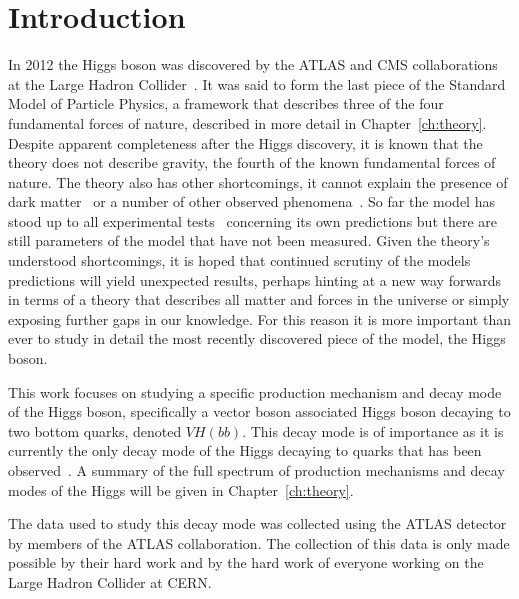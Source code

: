 \chapter{Introduction}%
\label{ch:intro}

In 2012 the Higgs boson was discovered by the ATLAS and CMS collaborations at
the Large Hadron Collider~\cite{DiscoHiggsATLAS, DiscoHiggsCMS}. It was said to
form the last piece of the Standard Model of Particle Physics, a framework that
describes three of the four fundamental forces of nature, described in more
detail in Chapter~\ref{ch:theory}. Despite apparent completeness after the
Higgs discovery, it is known that the theory does not describe gravity, the
fourth of the known fundamental forces of nature. The theory also has other
shortcomings, it cannot explain the presence of dark matter~\cite{DM-ev-sloan,
  DM-ev-nucleosynth, DM-ev-supernova, DM-ev-scaffold, DM-ev-direct,
  DM-ev-strong-lens, DM-ev-candidates, DM-ev-PDG, DM-ev-Zwicky,
  DM-ev-nonbaryonic, DM-ev-particle} or a number of other observed
phenomena~\cite{anom-BD-branching, anom-Dtau-excess, anom-g-2,
  anom-proton-radius, anom-bsll-trans}. So far the model has stood up to all
experimental tests~\cite{EWtests, 1998-SMtests} concerning its own predictions
but there are still parameters of the model that have not been measured. Given
the theory's understood shortcomings, it is hoped that continued scrutiny of the
models predictions will yield unexpected results, perhaps hinting at a new
way forwards in terms of a theory that describes all matter and forces in the
universe or simply exposing further gaps in our knowledge. For this reason it is
more important than ever to study in detail the most recently discovered piece
of the model, the Higgs boson.

This work focuses on studying a specific production mechanism and decay mode of
the Higgs boson, specifically a vector boson associated Higgs boson decaying to
two bottom quarks, denoted $VH(bb)$. This decay mode is of importance as it is
currently the only decay mode of the Higgs decaying to quarks that has been
observed~\cite{vhbb-obs}. A summary of the full spectrum of production
mechanisms and decay modes of the Higgs will be given in
Chapter~\ref{ch:theory}.

The data used to study this decay mode was collected using the ATLAS detector by
members of the ATLAS collaboration. The collection of this data is only made
possible by their hard work and by the hard work of everyone working on the
Large Hadron Collider at CERN.


